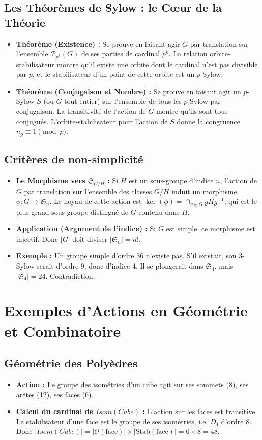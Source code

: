 \documentclass[12pt, a4paper, parskip=full]{report}
\theoremstyle{agregstyle}
\begin{document}
\subsection{Les Théorèmes de Sylow : le Cœur de la Théorie}
\begin{itemize}
    \item \textbf{Théorème (Existence) :} Se prouve en faisant agir $G$ par translation sur l'ensemble $\mathcal{P}_{p^k}(G)$ de ses parties de cardinal $p^k$. La relation orbite-stabilisateur montre qu'il existe une orbite dont le cardinal n'est pas divisible par $p$, et le stabilisateur d'un point de cette orbite est un $p$-Sylow.
    \item \textbf{Théorème (Conjugaison et Nombre) :} Se prouve en faisant agir un $p$-Sylow $S$ (ou $G$ tout entier) sur l'ensemble de tous les $p$-Sylow par conjugaison. La transitivité de l'action de $G$ montre qu'ils sont tous conjugués. L'orbite-stabilisateur pour l'action de $S$ donne la congruence $n_p \equiv 1 \pmod p$.
\end{itemize}

\subsection{Critères de non-simplicité}
\begin{itemize}
    \item \textbf{Le Morphisme vers $\mathfrak{S}_{G/H}$ :} Si $H$ est un sous-groupe d'indice $n$, l'action de $G$ par translation sur l'ensemble des classes $G/H$ induit un morphisme $\phi: G \to \mathfrak{S}_n$. Le noyau de cette action est $\ker(\phi) = \cap_{g \in G} gHg^{-1}$, qui est le plus grand sous-groupe distingué de $G$ contenu dans $H$.
    \item \textbf{Application (Argument de l'indice) :} Si $G$ est simple, ce morphisme est injectif. Donc $|G|$ doit diviser $|\mathfrak{S}_n| = n!$.
    \item \textbf{Exemple :} Un groupe simple d'ordre 36 n'existe pas. S'il existait, son 3-Sylow serait d'ordre 9, donc d'indice 4. Il se plongerait dans $\mathfrak{S}_4$, mais $|\mathfrak{S}_4|=24$. Contradiction.
\end{itemize}

\section{Exemples d'Actions en Géométrie et Combinatoire}
\subsection{Géométrie des Polyèdres}
\begin{itemize}
    \item \textbf{Action :} Le groupe des isométries d'un cube agit sur ses sommets (8), ses arêtes (12), ses faces (6).
    \item \textbf{Calcul du cardinal de $Isom(Cube)$ :} L'action sur les faces est transitive. Le stabilisateur d'une face est le groupe de ses isométries, i.e. $D_4$ d'ordre 8. Donc $|Isom(Cube)| = |\mathcal{O}(\text{face})| \times |\mathrm{Stab}(\text{face})| = 6 \times 8 = 48$.
\end{itemize}
\end{document}
